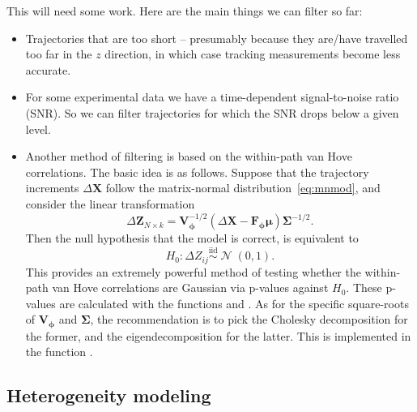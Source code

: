 \documentclass[article]{jss}
\newcommand{\fct}[1]{\code{#1()}}
\newcommand{\nd}{k}
\newcommand{\pph}{\bm{\phi}}
\newcommand{\FF}{\bm{F}}
\newcommand{\mmu}{\bm{\mu}}
\newcommand{\SSi}{\bm{\Sigma}}
\newcommand{\XX}{\bm{X}}
\newcommand{\dXX}{\Delta\XX}
\newcommand{\VV}{\bm{V}}
\newcommand{\ZZ}{\bm{Z}}
\newcommand{\dZZ}{\Delta\ZZ}
\newcommand{\iid}{\stackrel{\mathrm{iid}}{\sim}}
\DeclareMathOperator{\N}{\mathcal{N}}
\begin{document}
This will need some work.  Here are the main things we can filter so far:
\begin{itemize}
\item Trajectories that are too short -- presumably because they are/have travelled too far in the $z$ direction, in which case tracking measurements become less accurate.
\item For some experimental data we have a time-dependent signal-to-noise ratio (SNR).  So we can filter trajectories for which the SNR drops below a given level.
\item Another method of filtering is based on the within-path van Hove correlations.  The basic idea is as follows.  Suppose that the trajectory increments $\dXX$ follow the matrix-normal distribution~\eqref{eq:mnmod}, and consider the linear transformation
  \[
    \dZZ_{N\times\nd} = \VV_{\pph}^{-1/2}(\dXX - \FF_{\pph}\mmu)\SSi^{-1/2}.
  \]
  Then the null hypothesis that the model is correct, is equivalent to
  \[
    H_0: \Delta Z_{ij} \iid \N(0,1).
  \]
  This provides an extremely powerful method of testing whether the within-path van Hove correlations are Gaussian via p-values against $H_0$.  These p-values are calculated with the functions \fct{ad\_test} and \fct{sw\_test}.  As for the specific square-roots of $\VV_{\pph}$ and $\SSi$, the recommendation is to pick the Cholesky decomposition for the former, and the eigendecomposition for the latter.  This is implemented in the function \fct{lsc\_resid}.
  
\end{itemize}

\subsection{Heterogeneity modeling}
\end{document}
